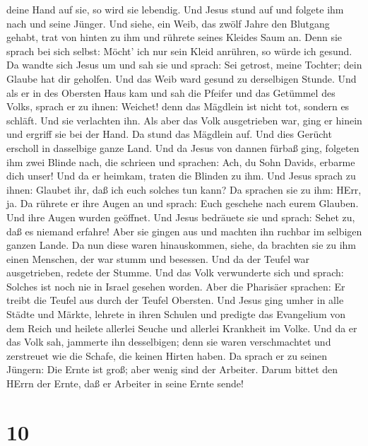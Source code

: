 deine Hand auf sie, so wird sie lebendig.  Und Jesus stund
auf und folgete ihm nach und seine Jünger.  Und siehe, ein
Weib, das zwölf Jahre den Blutgang gehabt, trat von hinten zu ihm und
rührete seines Kleides Saum an.  Denn sie sprach bei sich
selbst: Möcht' ich nur sein Kleid anrühren, so würde ich gesund.
 Da wandte sich Jesus um und sah sie und sprach: Sei
getrost, meine Tochter; dein Glaube hat dir geholfen. Und das Weib ward
gesund zu derselbigen Stunde.  Und als er in des Obersten
Haus kam und sah die Pfeifer und das Getümmel des Volks, 
sprach er zu ihnen: Weichet! denn das Mägdlein ist nicht tot, sondern es
schläft. Und sie verlachten ihn.  Als aber das Volk
ausgetrieben war, ging er hinein und ergriff sie bei der Hand. Da stund
das Mägdlein auf.  Und dies Gerücht erscholl in dasselbige
ganze Land.  Und da Jesus von dannen fürbaß ging, folgeten
ihm zwei Blinde nach, die schrieen und sprachen: Ach, du Sohn Davids,
erbarme dich unser!  Und da er heimkam, traten die Blinden
zu ihm. Und Jesus sprach zu ihnen: Glaubet ihr, daß ich euch solches tun
kann? Da sprachen sie zu ihm: HErr, ja.  Da rührete er ihre
Augen an und sprach: Euch geschehe nach eurem Glauben.  Und
ihre Augen wurden geöffnet. Und Jesus bedräuete sie und sprach: Sehet
zu, daß es niemand erfahre!  Aber sie gingen aus und
machten ihn ruchbar im selbigen ganzen Lande.  Da nun diese
waren hinauskommen, siehe, da brachten sie zu ihm einen Menschen, der
war stumm und besessen.  Und da der Teufel war
ausgetrieben, redete der Stumme. Und das Volk verwunderte sich und
sprach: Solches ist noch nie in Israel gesehen worden. 
Aber die Pharisäer sprachen: Er treibt die Teufel aus durch der Teufel
Obersten.  Und Jesus ging umher in alle Städte und Märkte,
lehrete in ihren Schulen und predigte das Evangelium von dem Reich und
heilete allerlei Seuche und allerlei Krankheit im Volke. 
Und da er das Volk sah, jammerte ihn desselbigen; denn sie waren
verschmachtet und zerstreuet wie die Schafe, die keinen Hirten haben.
 Da sprach er zu seinen Jüngern: Die Ernte ist groß; aber
wenig sind der Arbeiter.  Darum bittet den HErrn der Ernte,
daß er Arbeiter in seine Ernte sende!

\hypertarget{section-9}{%
\section{10}\label{section-9}}

